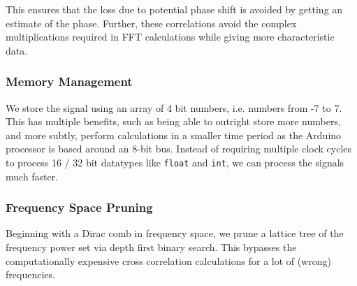 This ensures that the loss due to potential phase shift is avoided by getting an
estimate of the phase. Further, these correlations avoid the complex
multiplications required in FFT calculations while giving more characteristic
data. 

\subsubsection{Memory Management}
We store the signal using an array of 4 bit numbers, i.e. numbers from -7 to 7.
This has multiple benefits, such as being able to outright store more numbers,
and more subtly, perform calculations in a smaller time period as the Arduino
processor is based around an 8-bit bus. Instead of requiring multiple clock
cycles to process 16 / 32 bit datatypes like \texttt{float} and \texttt{int}, we
can process the signals much faster.

\subsubsection{Frequency Space Pruning}
Beginning with a Dirac comb in frequency space, we prune a lattice tree of the
frequency power set via depth first binary search. This bypasses the
computationally expensive cross correlation calculations for a lot of (wrong)
frequencies. 